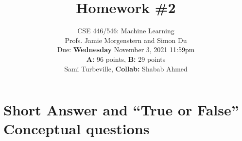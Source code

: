 \documentclass[shortlabels]{article}
\begin{document}
\setcounter{aprob}{0}
\setcounter{bprob}{0}
\title{Homework \#2}
\author{
    \normalsize{CSE 446/546: Machine Learning}\\
    \normalsize{Profs. Jamie Morgenstern and Simon Du}\\
    \normalsize{Due: \textbf{Wednesday} November 3, 2021 11:59pm}\\
    \normalsize{\textbf{A:} 96 points, \textbf{B:} 29 points} \\
    \normalsize{Sami Turbeville, \textbf{Collab:} Shabab Ahmed}
    }
\date{{}}
\maketitle

\section*{Short Answer and ``True or False'' Conceptual questions}
\end{document}
